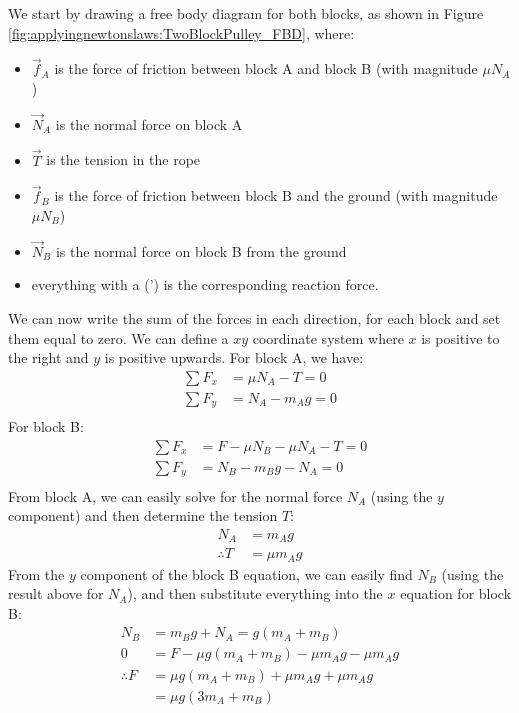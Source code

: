 \begin{solution}
We start by drawing a free body diagram for both blocks, as shown in Figure \ref{fig:applyingnewtonslaws:TwoBlockPulley_FBD}, where:
\begin{itemize}
\item $\vec f_A$ is the force of friction between block A and block B (with magnitude $\mu N_A$)
\item $\vec N_A$ is the normal force on block A
\item $\vec T$ is the tension in the rope
\item $\vec f_B$ is the force of friction between block B and the ground (with magnitude $\mu N_B$)
\item $\vec N_B$ is the normal force on block B from the ground
\item everything with a (') is the corresponding reaction force.
\end{itemize}
We can now write the sum of the forces in each direction, for each block and set them equal to zero. We can define a $xy$ coordinate system where $x$ is positive to the right and $y$ is positive upwards. For block A, we have:
\begin{align*}
\sum F_x &=\mu N_A - T = 0 \\
\sum F_y &= N_A-m_Ag = 0 \\
\end{align*}
For block B:
\begin{align*}
\sum F_x &= F-\mu N_B-\mu N_A-T= 0 \\
\sum F_y &= N_B-m_Bg-N_A = 0 \\
\end{align*}
From block A, we can easily solve for the normal force $N_A$ (using the $y$ component) and then determine the tension $T$:
\begin{align*}
N_A&=m_Ag\\
\therefore T&=\mu m_Ag
\end{align*}
From the $y$ component of the block B equation, we can easily find $N_B$ (using the result above for $N_A$), and then substitute everything into the $x$ equation for block B:
\begin{align*}
N_B&=m_Bg+N_A=g(m_A+m_B)\\
0&=F-\mu g(m_A+m_B)-\mu m_Ag-\mu m_Ag\\
\therefore F&=\mu g(m_A+m_B)+\mu m_Ag+\mu m_Ag\\
&=\mu g(3m_A+m_B)
\end{align*}
\end{solution}

